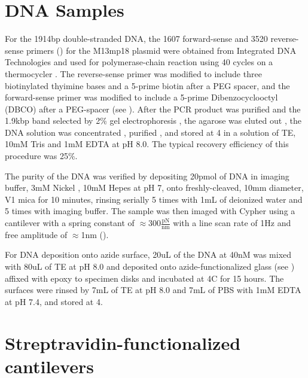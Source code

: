 \section{DNA Samples}

\firstp For the 1914bp double-stranded DNA, the 1607 forward-sense and 3520 reverse-sense primers () for the M13mp18 plasmid  were obtained from Integrated DNA Technologies  and used for polymerase-chain reaction  using 40 cycles on a thermocycler . The reverse-sense primer was modified to include three biotinylated thyimine bases and a 5-prime biotin after a PEG spacer, and the forward-sense primer was modified to include a 5-prime Dibenzocyclooctyl (DBCO) after a PEG-spacer (see ). After the PCR product was purified  and the 1.9kbp band selected by 2\% gel electrophoresis , the agarose was eluted out , the DNA solution was concentrated , purified , and stored at 4\degreeC{} in a solution of TE, 10mM Tris  and 1mM EDTA  at pH 8.0. The typical recovery efficiency of this procedure was 25\%. \pl

The purity of the DNA was verified by depositing 20pmol of DNA in imaging buffer, 3mM Nickel , 10mM Hepes  at pH 7, onto freshly-cleaved, 10mm diameter, V1 mica  for 10 minutes, rinsing serially 5 times with 1mL of deionized water and 5 times with imaging buffer. The sample was then imaged with Cypher using a cantilever with a spring constant of $\approx 300 \frac{\text{pN}}{\text{nm}}$  with a line scan rate of 1Hz and free amplitude of $\approx$1nm ().\pl 

For DNA deposition onto azide surface, 20uL of the DNA at 40nM was mixed with 80uL of TE at pH 8.0 and deposited onto azide-functionalized glass (see ) affixed with epoxy  to specimen disks  and incubated at 4C for 15 hours. The surfaces were rinsed by 7mL of TE at pH 8.0 and 7mL of PBS with 1mM EDTA at pH 7.4, and stored at 4\degreeC{}. 

\section{Streptravidin-functionalized cantilevers}


